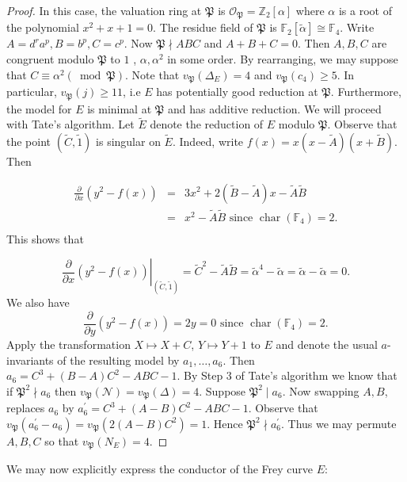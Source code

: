\documentclass[]{article}
\newcommand {\mfp}{{\mathfrak{P}}}
\begin{document}
\begin{proof}
In this case, the valuation ring at $\mfp$ is $\mathcal{O}_{\mathfrak{P}}=\mathbb{Z}_2[\alpha]$ where $\alpha$ is a root of the polynomial $x^2+x+1=0$. The residue field of $\mathfrak{P}$ is $\mathbb{F}_2[\tilde{\alpha}] \cong \mathbb{F}_4$. Write $A=d^ra^p, B=b^p, C=c^p$. Now $\mathfrak{P} \nmid A B C$ and $A+B+C=0$. Then $A, B, C$ are congruent modulo $\mathfrak{P}$ to $1$ , $\alpha, \alpha^2$ in some order. By rearranging, we may suppose that $C \equiv \alpha^2(\bmod \mathfrak{P})$. Note that $v_{\mathfrak{P}}(\Delta_E)=4$ and $v_{\mathfrak{P}}\left(c_4\right)\ge 5$. In particular, $v_{\mathfrak{P}}(j)\ge 11$, i.e $E$ has potentially good reduction at $\mathfrak{P}$. Furthermore, the model for $E$ is minimal at $\mathfrak{P}$ and has additive reduction. We will proceed with Tate's algorithm. Let $\tilde{E}$ denote the reduction of $E$ modulo $\mfp$. Observe that the point $(\tilde{C}, \tilde{1})$ is singular on $\tilde{E}$. Indeed, write $f(x)=x(x-\tilde{A})(x+\tilde{B})$. Then

\begin{eqnarray*}
    \frac{\partial }{\partial x}(y^2-f(x))&=&3x^2+2(\tilde{B}-\tilde{A})x-\tilde{A}\tilde{B}\\
    &=&x^2-\tilde{A}\tilde{B}\text{ since  $\operatorname{char}(\mathbb{F}_4)=2$.}\\
\end{eqnarray*}This shows that

$$\left.\frac{\partial }{\partial x}(y^2-f(x))\right|_{(\tilde{C}, \tilde{1})}=\tilde{C}^2-\tilde{A}\tilde{B}=\tilde{\alpha}^4-\tilde{\alpha}=\tilde{\alpha}-\tilde{\alpha}=0.$$We also have $$\frac{\partial }{\partial y}(y^2-f(x))=2y=0\text{ since  $\operatorname{char}(\mathbb{F}_4)=2$.}$$Apply the transformation $X\mapsto X+C$, $Y\mapsto Y+1$ to $E$ and denote the usual $a$-invariants of the resulting model by $a_1, \ldots, a_6$. Then $a_6=C^3+(B-A) C^2-A B C-1$. By Step $3$ of Tate's algorithm we know that if $\mathfrak{P}^2 \nmid a_6$ then $v_{\mathfrak{P}}(\mathcal{N})=v_{\mathfrak{P}}(\Delta)=4$. Suppose $\mathfrak{P}^2 \mid a_6$. Now swapping $A, B$, replaces $a_6$ by $a_6^{\prime}=C^3+(A-B) C^2-A B C-1.$ Observe that $v_{\mathfrak{P}}\left(a_6^{\prime}-a_6\right)=v_{\mathfrak{P}}\left(2(A-B) C^2\right)=1$. Hence $\mathfrak{P}^2 \nmid a_6^{\prime}$. Thus we may permute $A,B,C$ so that $v_\mfp(N_E)=4$.
    
\end{proof}

We may now explicitly express the conductor of the Frey curve $E$:
\end{document}
